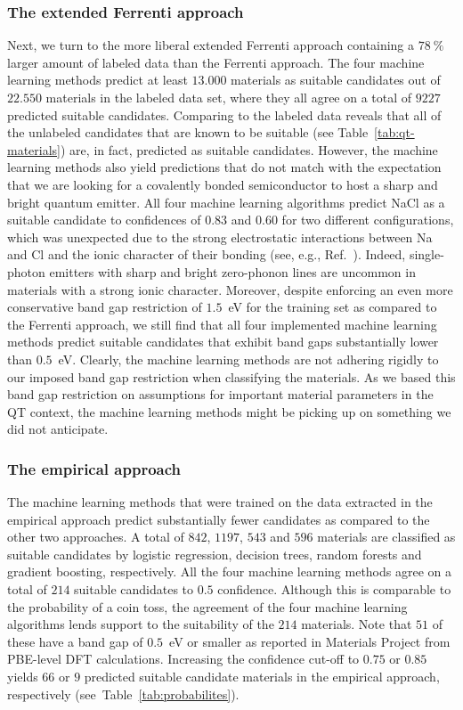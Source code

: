 \documentclass[superscriptaddress,unsortedaddress,
 amsmath,amssymb,
 aps,
]{revtex4-2}
\begin{document}
\subsubsection*{The extended Ferrenti approach}
Next, we turn to the more liberal extended Ferrenti approach containing a $78 \ \%$ larger 
amount of labeled data  
than the Ferrenti approach.  
The four machine learning methods predict at least $13.000$ materials as suitable candidates out of $22.550$ materials in the labeled data set, where they all agree on a total of $9227$ predicted suitable candidates. Comparing to the labeled data reveals that all of the unlabeled candidates that are known to be suitable (see Table~\ref{tab:qt-materials}) are, in fact, predicted as suitable candidates. 
However, the machine learning methods also yield predictions that do not match with the expectation that we are looking for a covalently bonded semiconductor to host a sharp and bright quantum emitter. 
% 
All four machine learning algorithms predict NaCl as a suitable candidate to confidences of $0.83$ and $0.60$ for two different configurations,  which was unexpected due to the strong electrostatic interactions between Na and Cl and the ionic character of their bonding (see, e.g., Ref.~\cite{Weber2010}).  
Indeed, single-photon emitters with sharp and bright zero-phonon lines are uncommon in materials with a strong ionic character. 
Moreover, despite enforcing an even more conservative band gap restriction of $1.5$~eV for the training set as compared to the Ferrenti approach, we still find that all four implemented machine learning methods predict suitable candidates that exhibit band gaps substantially lower than $0.5$~eV. 
Clearly, the machine learning methods are not adhering rigidly to our imposed band gap restriction when classifying the materials. 
As we based this band gap restriction on assumptions for important material parameters in the QT context, the machine learning methods might be picking up on something we did not anticipate. 

 
\subsubsection*{The empirical approach}
The machine learning methods that were trained on the data extracted in the empirical approach predict substantially fewer candidates as compared to the other two approaches. 
A total of $842$, $1197$, $543$ and $596$ materials are classified as suitable candidates by logistic regression, decision trees, random forests and gradient boosting, respectively. All the four machine learning methods agree on a total of $214$ suitable candidates to $0.5$ confidence.   
Although this is comparable to the probability of a coin toss, the agreement of the four machine learning algorithms lends support to the suitability of the $214$ materials. 
Note that $51$ of these have a band gap of $0.5$~eV or smaller as reported in Materials Project from PBE-level DFT calculations.  Increasing the confidence cut-off to $0.75$ or $0.85$ yields $66$ or $9$ predicted suitable candidate materials in the empirical approach, respectively (see~Table~\ref{tab:probabilites}). 
\end{document}
